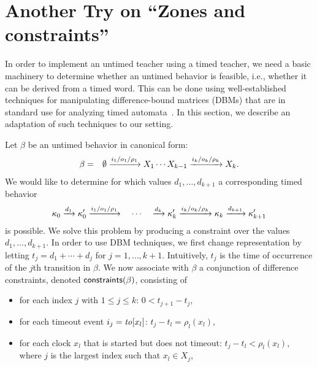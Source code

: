 \section{Another Try on ``Zones and constraints''}

In order to implement an untimed teacher using a timed teacher, we need a
basic machinery to determine whether an untimed behavior is feasible, i.e.,
whether it can be derived from a timed word. This can be done using
well-established techniques for manipulating difference-bound matrices
(DBMs) that are in standard use for analyzing timed
automata~\cite{Di89,BengtssonY03}.
In this section, we describe an adaptation of such techniques to
our setting.

Let $\beta$ be an untimed behavior in canonical form:
\begin{eqnarray*}
\beta & = & \emptyset \xrightarrow{i_1/o_1/\rho_1} X_1  \cdots X_{k-1} \xrightarrow{i_k/o_k/\rho_k} X_k.
\end{eqnarray*}
We would like to determine for which values $d_1, \ldots , d_{k+1}$
a corresponding timed behavior
\[
\kappa_0 \xrightarrow{d_1} \kappa'_0 \xrightarrow{i_1/o_1/\rho_1}
\quad \cdots \quad
\xrightarrow{d_k} \kappa'_k \xrightarrow{i_k/o_k/\rho_k} \kappa_k
\xrightarrow{d_{k+1}} \kappa'_{k+1}
\]
is possible. We solve this problem by producing a constraint over the
values $d_1, \ldots , d_{k+1}$. In order to use DBM techniques, we first
change representation by letting
$t_j = d_1 + \cdots + d_j$ for $j = 1 , \ldots, k+1$. Intuitively, $t_j$ is
the time of occurrence of the $j$th transition in $\beta$.
We now associate with $\beta$ a conjunction of difference constraints, denoted
$\mathsf{constraints}({\beta})$, consisting of
\begin{itemize}
\item
for each index $j$ with $1 \leq j \leq k$:  $0 <  t_{j+1} - t_j$,
\item
for each timeout event $i_j = \mathit{to}[x_l]$: $t_j - t_l = \rho_l(x_l)$,
\item
for each clock $x_l$ that is started but does not timeout: $t_j -t_l < \rho_l(x_l)$,
where $j$ is the largest index such that $x_l \in X_j$,
\end{itemize}
